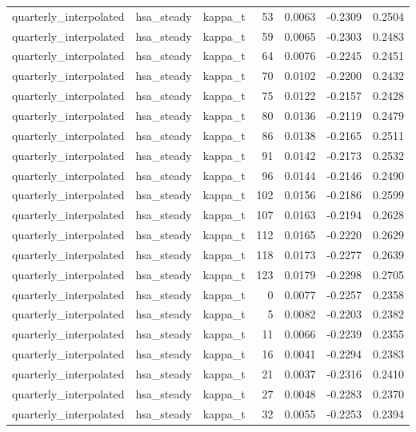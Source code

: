 \begin{tabular}{lllrrrr}
quarterly\_interpolated & hsa\_steady & kappa\_t & 53 & 0.0063 & -0.2309 & 0.2504 \\
quarterly\_interpolated & hsa\_steady & kappa\_t & 59 & 0.0065 & -0.2303 & 0.2483 \\
quarterly\_interpolated & hsa\_steady & kappa\_t & 64 & 0.0076 & -0.2245 & 0.2451 \\
quarterly\_interpolated & hsa\_steady & kappa\_t & 70 & 0.0102 & -0.2200 & 0.2432 \\
quarterly\_interpolated & hsa\_steady & kappa\_t & 75 & 0.0122 & -0.2157 & 0.2428 \\
quarterly\_interpolated & hsa\_steady & kappa\_t & 80 & 0.0136 & -0.2119 & 0.2479 \\
quarterly\_interpolated & hsa\_steady & kappa\_t & 86 & 0.0138 & -0.2165 & 0.2511 \\
quarterly\_interpolated & hsa\_steady & kappa\_t & 91 & 0.0142 & -0.2173 & 0.2532 \\
quarterly\_interpolated & hsa\_steady & kappa\_t & 96 & 0.0144 & -0.2146 & 0.2490 \\
quarterly\_interpolated & hsa\_steady & kappa\_t & 102 & 0.0156 & -0.2186 & 0.2599 \\
quarterly\_interpolated & hsa\_steady & kappa\_t & 107 & 0.0163 & -0.2194 & 0.2628 \\
quarterly\_interpolated & hsa\_steady & kappa\_t & 112 & 0.0165 & -0.2220 & 0.2629 \\
quarterly\_interpolated & hsa\_steady & kappa\_t & 118 & 0.0173 & -0.2277 & 0.2639 \\
quarterly\_interpolated & hsa\_steady & kappa\_t & 123 & 0.0179 & -0.2298 & 0.2705 \\
quarterly\_interpolated & hsa\_steady & kappa\_t & 0 & 0.0077 & -0.2257 & 0.2358 \\
quarterly\_interpolated & hsa\_steady & kappa\_t & 5 & 0.0082 & -0.2203 & 0.2382 \\
quarterly\_interpolated & hsa\_steady & kappa\_t & 11 & 0.0066 & -0.2239 & 0.2355 \\
quarterly\_interpolated & hsa\_steady & kappa\_t & 16 & 0.0041 & -0.2294 & 0.2383 \\
quarterly\_interpolated & hsa\_steady & kappa\_t & 21 & 0.0037 & -0.2316 & 0.2410 \\
quarterly\_interpolated & hsa\_steady & kappa\_t & 27 & 0.0048 & -0.2283 & 0.2370 \\
quarterly\_interpolated & hsa\_steady & kappa\_t & 32 & 0.0055 & -0.2253 & 0.2394 \\

\end{tabular}
